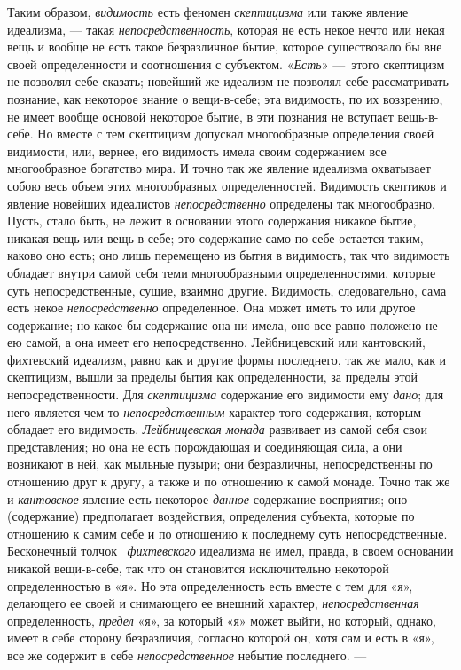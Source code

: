 Таким образом, {\em видимость} есть феномен
{\em скептицизма} или также явление идеализма, — такая
{\em непосредственность}, которая не есть некое нечто
или некая вещь и вообще не есть такое безразличное бытие, которое
существовало бы вне своей определенности и соотношения с субъектом.
«{\em Есть}» —~этого скептицизм не позволял себе
сказать; новейший же идеализм не позволял себе рассматривать познание, как
некоторое знание о вещи-в-себе; эта видимость, по их воззрению, не имеет
вообще основой некоторое бытие, в эти познания не вступает вещь-в-себе. Но
вместе с тем скептицизм допускал многообразные определения своей видимости,
или, вернее, его видимость имела своим содержанием все многообразное
богатство мира. И точно так же явление идеализма охватывает собою весь
объем этих многообразных определенностей. Видимость скептиков и явление
новейших идеалистов {\em непосредственно} определены
так многообразно. Пусть, стало быть, не лежит в основании этого содержания
никакое бытие, никакая вещь или вещь-в-себе; это содержание само по себе
остается таким, каково оно есть; оно лишь перемещено из бытия в видимость,
так что видимость обладает внутри самой себя теми многообразными
определенностями, которые суть непосредственные, сущие, взаимно другие.
Видимость, следовательно, сама есть некое
{\em непосредственно} определенное. Она может иметь то
или другое содержание; но какое бы содержание она ни имела, оно все равно
положено не ею самой, а она имеет его непосредственно. Лейбницевский или
кантовский, фихтевский идеализм, равно как и другие формы последнего, так
же мало, как и скептицизм, вышли за пределы бытия как определенности, за
пределы этой непосредственности. Для {\em скептицизма}
содержание его видимости ему {\em дано}; для него
является чем-то {\em непосредственным} характер того
содержания, которым обладает его видимость.
{\em Лейбницевская монада} развивает из самой себя свои
представления; но она не есть порождающая и соединяющая сила, а они
возникают в ней, как мыльные пузыри; они безразличны, непосредственны по
отношению друг к другу, а также и по отношению к самой монаде. Точно так же
и {\em кантовское} явление есть некоторое
{\em данное} содержание восприятия; оно (содержание)
предполагает воздействия, определения субъекта, которые по отношению к
самим себе и по отношению к последнему суть непосредственные. Бесконечный
толчок~
{\em фихтевского} идеализма не имел, правда, в своем
основании никакой вещи-в-себе, так что он становится исключительно
некоторой определенностью в «я». Но эта определенность есть вместе с тем
для «я», делающего ее своей и снимающего ее внешний характер,
{\em непосредственная} определенность,
{\em предел} «я», за который «я» может выйти, но
который, однако, имеет в себе сторону безразличия, согласно которой он,
хотя сам и есть в «я», все же содержит в себе
{\em непосредственное} небытие последнего. —

